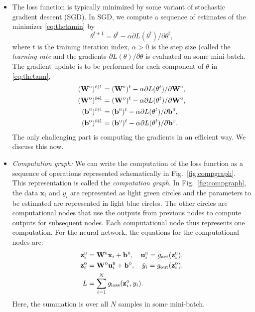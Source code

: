 \documentclass[11pt]{article}
\def\beq{\begin{equation}}
\def\eeq{\end{equation}}
\def\tp1{t\! + \! 1}
\newcommand{\bbf}{\mathbf{b}}
\newcommand{\ubf}{\mathbf{u}}
\newcommand{\xbf}{\mathbf{x}}
\newcommand{\zbf}{\mathbf{z}}
\newcommand{\Wbf}{\mathbf{W}}
\def\hid{\textsc{\tiny H}}
\def\out{\textsc{\tiny O}}
\begin{document}
\begin{itemize}
\item The loss function is typically
minimized by some variant of stochastic gradient descent (SGD).  In SGD, we compute
a sequence of estimates of the minimizer \eqref{eq:thetamin} by
\beq \label{eq:thgrad_step}
    \theta^{\tp1} = \theta^t - \alpha \partial L(\theta^t)/\partial \theta^t,
\eeq
where $t$ is the training iteration index, $\alpha > 0$ is the step size
(called the \emph{learning rate} and the gradients
$\partial L(\theta)/\partial \theta$ is evaluated on some mini-batch.
The gradient update is to be performed for each component of $\theta$ in
\eqref{eq:thetann},
\begin{align*}
   (\Wbf^\hid)^{\tp1} &= (\Wbf^\hid)^{t} - \alpha \partial L(\theta^t) / \partial \Wbf^\hid , \\
   (\Wbf^\out)^{\tp1} &= (\Wbf^\out)^{t} - \alpha \partial L(\theta^t) / \partial \Wbf^\out, \\
   (\bbf^\hid)^{\tp1} &= (\bbf^\hid)^{t} - \alpha \partial L(\theta^t) / \partial \bbf^\hid, \\
   (\bbf^\out)^{\tp1} &= (\bbf^\out)^{t} - \alpha \partial L(\theta^t) / \partial \bbf^\out.
\end{align*}
The only challenging part is computing the gradients in an efficient way.
We discuss this now.

\item \emph{Computation graph:}
We can write the computation of the loss function
as a sequence of operations represented schematically in Fig.~\ref{fig:compgraph}.
This representation is called the \emph{computation graph}.
In Fig.~\ref{fig:compgraph},
the data $\xbf_i$ and $y_i$ are represented as light green circles
and the parameters to be estimated are represented in light blue circles.
The other circles are computational nodes that use the outputs
from previous nodes to compute outputs for subsequent nodes.
Each computational node thus represents one computation.
For the neural network, the equations for the computational nodes are:
\begin{align*}
    \zbf^\hid_i &= \Wbf^\hid\xbf_i + \bbf^\hid, \quad
    \ubf^\hid_i = g_{\rm act}(\zbf^\hid_i), \\
    \zbf^\out_i &= \Wbf^\out\ubf^\hid_i + \bbf^\out, \quad
    \hat{y}_i = g_{\rm out}(\zbf^\out_i). \\
    L &= \sum_{i=1}^N g_{\rm loss}(\zbf^\out_i,y_i).
\end{align*}
Here, the summation is over all $N$ samples in some mini-batch.


\end{itemize}
\end{document}
